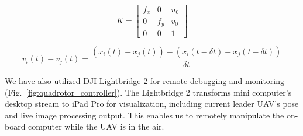 \begin{equation}\label{eq:intrinsic}
K=\begin{bmatrix}f_x&0&u_0\\0&f_y&v_0\\0&0&1\end{bmatrix}
\end{equation}

\begin{equation}\label{eq:differentiation}
v_i(t)-v_j(t)=\frac{(x_i(t)-x_j(t))-(x_i(t-\delta t)-x_j(t-\delta t))}{\delta t}
\end{equation}

We have also utilized DJI Lightbridge 2 for remote debugging and monitoring (Fig.~\ref{fig:quadrotor_controller}). The Lightbridge 2 transforms mini computer's desktop stream to iPad Pro for visualization, including current leader UAV's pose and live image processing output. This enables us to remotely manipulate the on-board computer while the UAV is in the air.

\newpage
